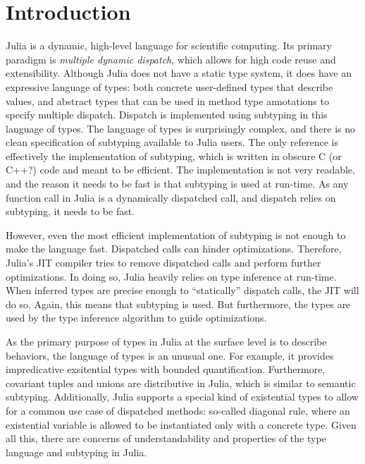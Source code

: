 \chapter{Introduction}


Julia is a dynamic, high-level language for scientific computing.
Its primary paradigm is \emph{multiple dynamic dispatch}, which allows for
high code reuse and extensibility. Although Julia does not have a static type
system, it does have an expressive language of types: both concrete user-defined
types that describe values, and abstract types that can be used in method type
annotations to specify multiple dispatch. Dispatch is implemented using
subtyping in this language of types.
The language of types is surprisingly complex, and there is no clean
specification of subtyping available to Julia users. The only reference is
effectively the implementation of subtyping, which is written in obscure C (or
C++?) code and meant to be efficient. The implementation is not very readable,
and the reason it needs to be fast is that subtyping is used at run-time.
As any function call in Julia is a dynamically dispatched call, and dispatch
relies on subtyping, it needs to be fast.

However, even the most efficient implementation of subtyping is not enough to
make the language fast. Dispatched calls can hinder optimizations. Therefore,
Julia's JIT compiler tries to remove dispatched calls and perform further
optimizations. In doing so, Julia heavily relies on type inference at run-time.
When inferred types are precise enough to ``statically'' dispatch calls, the JIT
will do so. Again, this means that subtyping is used. But furthermore, the types
are used by the type inference algorithm to guide optimizations.

As the primary purpose of types in Julia at the surface level is to describe
behaviors, the language of types is an unusual one. For example, it provides
impredicative exsitential types with bounded quantification. Furthermore,
covariant tuples and unions are distributive in Julia, which is similar to
semantic subtyping. Additionally, Julia supports a special kind of existential
types to allow for a common use case of dispatched methods: so-called diagonal
rule, where an existential variable is allowed to be instantiated only with a
concrete type. Given all this, there are concerns of understandability and
properties of the type language and subtyping in Julia.

